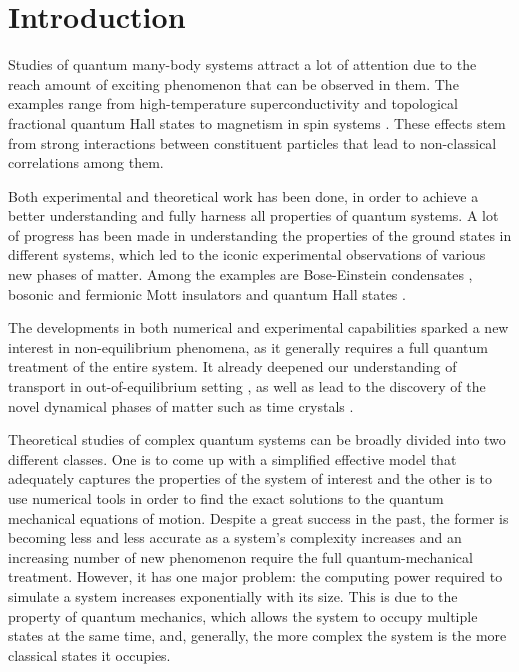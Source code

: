 \chapter{Introduction}
\label{introduction}

Studies of quantum many-body systems attract a lot of attention due to the reach amount of exciting phenomenon that can be observed in them. The examples range from high-temperature superconductivity \cite{Rev. Mod. Phys. 78, 17 (2006)} and topological fractional quantum Hall states \cite{Rev. Mod. Phys. 71, S298 (1999)} to magnetism in spin systems \cite{. Auerbach, Interacting Electrons and Quantum Magnetism (Springer, 1994)}. These effects stem from strong interactions between constituent particles that lead to non-classical correlations among them.

Both experimental and theoretical work has been done, in order to achieve a better understanding and fully harness all properties of quantum systems. A lot of progress has been made in understanding the properties of the ground states in different systems, which led to the iconic experimental observations of various new phases of matter. Among the examples are Bose-Einstein condensates \cite{wolfang, cornell}, bosonic \cite{Greiner2002} and fermionic \cite{tilman} Mott insulators and quantum Hall states \cite{quantum hall}. 

The developments in both numerical and experimental capabilities sparked a new interest in non-equilibrium phenomena, as it generally requires a full quantum treatment of the entire system. It already deepened our understanding of transport in out-of-equilibrium setting \cite{tilman}, as well as lead to the discovery of the novel dynamical phases of matter such as time crystals \cite{mich monroe}.

Theoretical studies of complex quantum systems can be broadly divided into two different classes. One is to come up with a simplified effective model that adequately captures the properties of the system of interest and the other is to use numerical tools in order to find the exact solutions to the quantum mechanical equations of motion. Despite a great success in the past, the former is becoming less and less accurate as a system's complexity increases and an increasing number of new phenomenon require the full quantum-mechanical treatment. However, it has one major problem: the computing power required to simulate a system increases exponentially with its size. This is due to the property of quantum mechanics, which allows the system to occupy multiple states at the same time, and, generally, the more complex the system is the more classical states it occupies.

